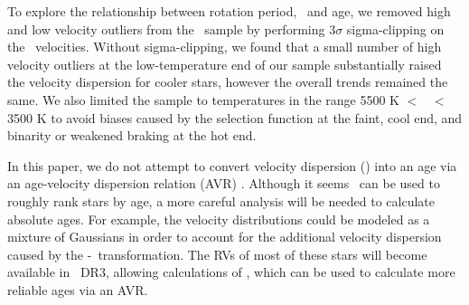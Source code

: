 
To explore the relationship between rotation period, \teff\ and age, we
removed high and low velocity outliers from the \mct\ sample by performing
3$\sigma$ sigma-clipping on the \vb\ velocities.
Without sigma-clipping, we found that a small number of high velocity
outliers at the low-temperature end of our sample substantially raised the
velocity dispersion for cooler stars, however the overall trends remained the
same.
We also limited the sample to temperatures in the range 5500 K $<$ \teff\ $<$
3500 K to avoid biases caused by the selection function at the faint, cool
end, and binarity or weakened braking \citep{vansaders2016} at the hot end.


In this paper, we do not attempt to convert velocity dispersion (\sigmavb)
into an age via an age-velocity dispersion relation (AVR)
\citep[\eg][]{holmberg2009}.
Although it seems \sigmavb\ can be used to roughly rank stars by age, a more
careful analysis will be needed to calculate absolute ages.
For example, the velocity distributions could be modeled as a mixture of
Gaussians in order to account for the additional velocity dispersion caused by
the \vz-\vb\ transformation.
The RVs of most of these stars will become available in \Gaia\ DR3, allowing
calculations of \vz, which can be used to calculate more reliable ages via an
AVR.
